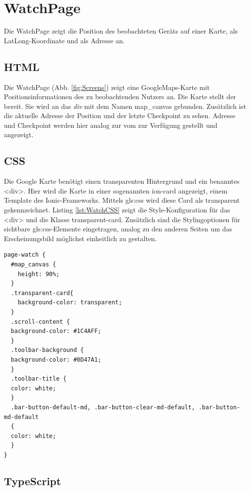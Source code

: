 \section{WatchPage}
\label{pag:WatchPage}

Die WatchPage zeigt die Position des beobachteten Geräts auf einer Karte, als LatLong-Koordinate und als Adresse an.

\subsection{HTML}

Die WatchPage (Abb. \ref{fig:Screens}) zeigt eine GoogleMaps-Karte mit Positionsinformationen des zu beobachtenden Nutzers an. Die Karte stellt der  bereit. Sie wird an das \emph{div} mit dem Namen 
\glqq map\_canvas\grqq{} gebunden.
Zusätzlich ist die aktuelle Adresse der Position und der letzte Checkpoint zu sehen.
Adresse und Checkpoint werden hier analog zur  vom  zur Verfügung gestellt und angezeigt.

\subsection{CSS}

Die Google Karte benötigt einen transparenten Hintergrund und ein benanntes <div>. Hier wird die Karte in einer sogenannten ion-card angezeigt, einem Template des Ionic-Frameworks. Mittels \gls{gls:css} wird diese Card als transparent gekennzeichnet. Listing \ref{lst:WatchCSS} zeigt die Style-Konfiguration für das <div> und die Klasse \glqq transparent-card\grqq{}. Zusätzlich sind die Stylingoptionen für sichtbare \gls{gls:css}-Elemente eingetragen, analog zu den anderen Seiten um das Erscheinungsbild möglichst einheitlich zu gestalten.

\begin{lstlisting}[float, language=HTML5, caption= Transparentes Canvas und Styling der WatchPage, label=lst:WatchCSS]
page-watch {
  #map_canvas {
    height: 90%;
  }
  .transparent-card{
    background-color: transparent;
  }
  .scroll-content {
  background-color: #1C4AFF;
  }
  .toolbar-background {
  background-color: #0D47A1;
  }
  .toolbar-title {
  color: white;
  }
  .bar-button-default-md, .bar-button-clear-md-default, .bar-button-md-default
  {
  color: white;
  }
}
\end{lstlisting}

\subsection{TypeScript}

